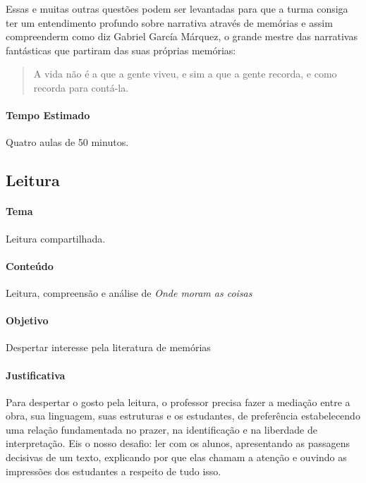 \documentclass[11pt]{extarticle}
\begin{document}
Essas e muitas outras questões podem ser levantadas para que a turma consiga ter um entendimento profundo sobre narrativa através de memórias e assim compreenderm como diz Gabriel García Márquez, o grande mestre das narrativas fantásticas que partiram das suas próprias memórias:

\begin{quote}

A vida não é a que a gente viveu, e sim a que a gente recorda, e como recorda para contá-la. 

\end{quote}

\paragraph{Tempo Estimado} Quatro aulas de 50 minutos. 

\subsection{Leitura}


\paragraph{Tema} Leitura compartilhada.  

\paragraph{Conteúdo} Leitura, compreensão e análise de \textit{Onde moram as coisas}

\paragraph{Objetivo} Despertar interesse pela literatura de memórias 

\paragraph{Justificativa} Para despertar o gosto pela leitura, o professor precisa fazer a mediação entre a obra, sua linguagem, suas estruturas e os estudantes, de preferência estabelecendo uma relação fundamentada no prazer, na identificação e na liberdade de interpretação. Eis o nosso desafio: ler com os alunos, apresentando as passagens decisivas de um texto, explicando por que elas chamam a atenção e  ouvindo as impressões dos estudantes a respeito de tudo isso. 
\end{document}
